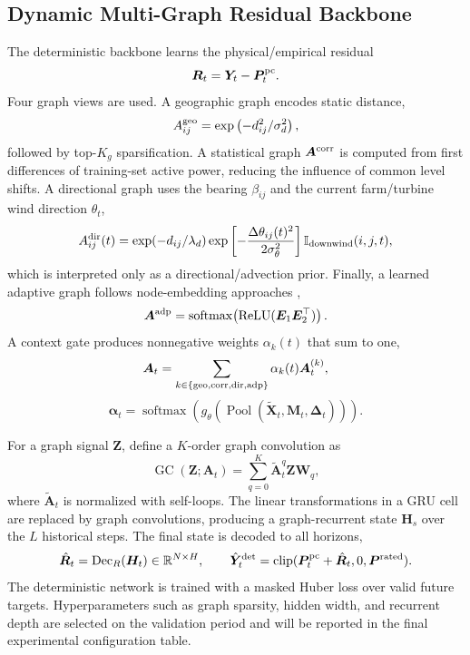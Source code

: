 \documentclass[journal]{IEEEtran}
\newcommand{\R}{\mathbb{R}}
\newcommand{\1}{\mathbb{I}}
\begin{document}
\subsection{Dynamic Multi-Graph Residual Backbone}
The deterministic backbone learns the physical/empirical residual
\begin{equation}
\bm R_t=\bm Y_t-\bm P^{\rm pc}_t.
\label{eq:R}
\end{equation}
Four graph views are used. A geographic graph encodes static distance,
\begin{equation}
A^{\rm geo}_{ij}=\exp\left(-d_{ij}^2/\sigma_d^2\right),
\end{equation}
followed by top-$K_g$ sparsification. A statistical graph $\bm A^{\rm corr}$ is computed from first differences of training-set active power, reducing the influence of common level shifts. A directional graph uses the bearing $\beta_{ij}$ and the current farm/turbine wind direction $\theta_t$,
\begin{equation}
A^{\rm dir}_{ij}(t)=\exp(-d_{ij}/\lambda_d)\exp\left[-\frac{\Delta\theta_{ij}(t)^2}{2\sigma_\theta^2}\right]\1_{\rm downwind}(i,j,t),
\label{eq:dir}
\end{equation}
which is interpreted only as a directional/advection prior. Finally, a learned adaptive graph follows node-embedding approaches \cite{wu2019graphwavenet,bai2020agcrn},
\begin{equation}
\bm A^{\rm adp}=\operatorname{softmax}\!\left(\operatorname{ReLU}(\bm E_1\bm E_2^\top)\right).
\end{equation}
A context gate produces nonnegative weights $\alpha_k(t)$ that sum to one,
\begin{equation}
\bm A_t=\sum_{k\in\{\rm geo,corr,dir,adp\}}\alpha_k(t)\bm A_t^{(k)},
\end{equation}
\begin{equation}
\bm\alpha_t=\operatorname{softmax}\!\left(g_\theta\!\left(\operatorname{Pool}(\tilde{\bm X}_t,\bm M_t,\bm\Delta_t)\right)\right).
\end{equation}

For a graph signal $\bm Z$, define a $K$-order graph convolution as
\begin{equation}
\operatorname{GC}(\bm Z;\bm A_t)=\sum_{q=0}^{K}\tilde{\bm A}_t^{q}\bm Z\bm W_q,
\end{equation}
where $\tilde{\bm A}_t$ is normalized with self-loops. The linear transformations in a GRU cell are replaced by graph convolutions, producing a graph-recurrent state $\bm H_s$ over the $L$ historical steps. The final state is decoded to all horizons,
\begin{equation}
\hat{\bm R}_t=\operatorname{Dec}_R(\bm H_t)\in\R^{N\times H},\qquad
\hat{\bm Y}^{\rm det}_t=\operatorname{clip}(\bm P^{\rm pc}_t+\hat{\bm R}_t,0,\bm P^{\rm rated}).
\label{eq:ydet}
\end{equation}
The deterministic network is trained with a masked Huber loss over valid future targets. Hyperparameters such as graph sparsity, hidden width, and recurrent depth are selected on the validation period and will be reported in the final experimental configuration table.
\end{document}
